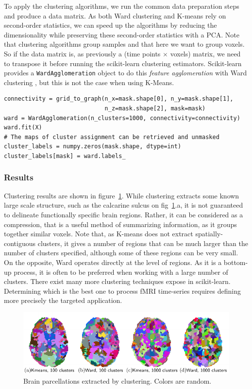 \documentclass{frontiersSCNS} %
\begin{document}
To apply the clustering algorithms, we run the common data preparation
steps and produce a data matrix. As both Ward clustering and K-means rely
on second-order statistics, we can speed up the algorithms by reducing
the dimensionality while preserving these second-order statistics with a
PCA. Note that clustering algorithms group samples and that here we want
to group voxels. So if the data matrix is, as previously a (time points
$\times$ voxels) matrix, we need to transpose it before running the
scikit-learn clustering estimators. Scikit-learn provides a
\texttt{WardAgglomeration} object to do this \emph{feature agglomeration}
with Ward clustering \citep{michel2012supervisedclustering}, but this is
not the case when using K-Means.

\begin{lstlisting}
connectivity = grid_to_graph(n_x=mask.shape[0], n_y=mask.shape[1],
                             n_z=mask.shape[2], mask=mask)
ward = WardAgglomeration(n_clusters=1000, connectivity=connectivity)
ward.fit(X)
# The maps of cluster assignment can be retrieved and unmasked
cluster_labels = numpy.zeros(mask.shape, dtype=int)
cluster_labels[mask] = ward.labels_
\end{lstlisting}

\subsubsection{Results}

Clustering results are shown in figure~\ref{fig:clustering}. While
clustering extracts some known large scale structure, such as the
calcarine sulcus on fig~\ref{fig:clustering}.a, it is not guaranteed to
delineate functionally specific brain regions. Rather, it can be considered as a compression, that
is a useful method of summarizing information, as it groups together
similar voxels. Note that, as K-means does not extract spatially-contiguous
clusters, it gives a number of regions that can be much larger than the
number of clusters specified, although some of these regions can be very
small. On the opposite, Ward operates directly at the level of regions.
As it is a bottom-up process, it is often to be preferred when working
with a large number of clusters. There exist many more clustering
techniques expose in scikit-learn. Determining which is the best one to
process fMRI time-series requires defining more precisely the targeted
application.

\begin{figure}[hbtp]
  \includegraphics[width=\linewidth]{scripts/clustering/figure}
  \caption{Brain parcellations extracted by clustering. Colors are
random.}
  \label{fig:clustering}
\end{figure}
\end{document}
